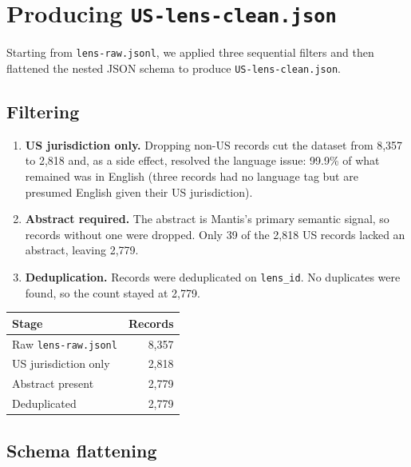 \documentclass[11pt]{article}
\begin{document}
\section{Producing \texttt{US-lens-clean.json}}
\label{sec:lens_cleaning}

Starting from \texttt{lens-raw.jsonl}, we applied three sequential filters and then
flattened the nested JSON schema to produce \texttt{US-lens-clean.json}.

\subsection{Filtering}

\begin{enumerate}
  \item \textbf{US jurisdiction only.} Dropping non-US records cut the dataset from 8,357
    to 2,818 and, as a side effect, resolved the language issue: 99.9\% of what remained
    was in English (three records had no language tag but are presumed English given their
    US jurisdiction).

  \item \textbf{Abstract required.} The abstract is Mantis's primary semantic signal, so
    records without one were dropped. Only 39 of the 2,818 US records lacked an abstract,
    leaving 2,779.

  \item \textbf{Deduplication.} Records were deduplicated on \texttt{lens\_id}. No
    duplicates were found, so the count stayed at 2,779.
\end{enumerate}

\begin{center}
\begin{tabular}{lr}
  \toprule
  \textbf{Stage} & \textbf{Records} \\
  \midrule
  Raw \texttt{lens-raw.jsonl} & 8,357 \\
  US jurisdiction only & 2,818 \\
  Abstract present & 2,779 \\
  Deduplicated & 2,779 \\
  \bottomrule
\end{tabular}
\end{center}

\subsection{Schema flattening}
\end{document}
